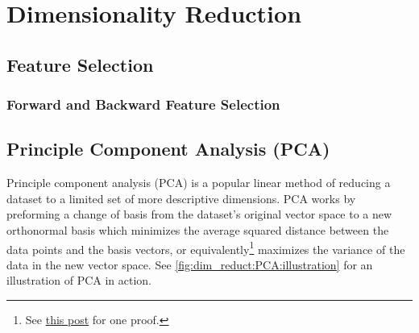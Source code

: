 \chapter{Dimensionality Reduction}
\label{chap:dim_reduct}

\section{Feature Selection}
\label{dim_reduct:feature_selection}

\subsection{Forward and Backward Feature Selection}
\label{dim_reduct:feature_selection:forward_backward}

\section{Principle Component Analysis (PCA)}
\label{dim_reduct:PCA}

Principle component analysis (PCA) \cite{pca} is a popular linear method
of reducing a dataset to a limited set of more descriptive dimensions.
PCA works by preforming a change of basis from
the dataset's original vector space to a new orthonormal basis which
minimizes the average squared distance between the data points and the basis vectors,
or equivalently\footnote{See
\href{https://stats.stackexchange.com/questions/32174/pca-objective-function-what-is-the-connection-between-maximizing-variance-and-m/136072\#136072}{this post}
for one proof.} maximizes the variance of the data in the new vector space.
See \cref{fig:dim_reduct:PCA:illustration} for an illustration of PCA in action.

